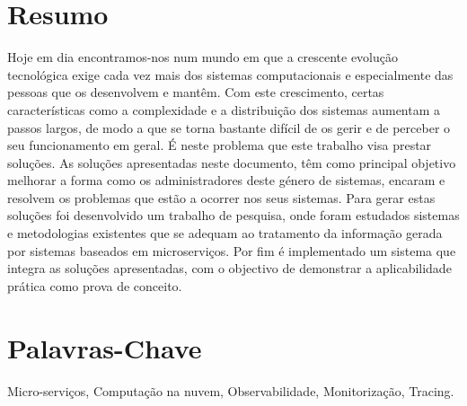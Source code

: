 
\section*{Resumo}
\label{sec:resumo}

Hoje em dia encontramos-nos num mundo em que a crescente evolução tecnológica exige cada vez mais dos sistemas computacionais e especialmente das pessoas que os desenvolvem e mantêm. Com este crescimento, certas características como a complexidade e a distribuição dos sistemas aumentam a passos largos, de modo a que se torna bastante difícil de os gerir e de perceber o seu funcionamento em geral. É neste problema que este trabalho visa prestar soluções. As soluções apresentadas neste documento, têm como principal objetivo melhorar a forma como os administradores deste género de sistemas, encaram e resolvem os problemas que estão a ocorrer nos seus sistemas. Para gerar estas soluções foi desenvolvido um trabalho de pesquisa, onde foram estudados sistemas e metodologias existentes que se adequam ao tratamento da informação gerada por sistemas baseados em microserviços. Por fim é implementado um sistema que integra as soluções apresentadas, com o objectivo de demonstrar a aplicabilidade prática como prova de conceito.

\section*{Palavras-Chave}
\label{sec:palavras}

Micro-serviços, Computação na nuvem, Observabilidade, Monitorização, Tracing.

\restoregeometry